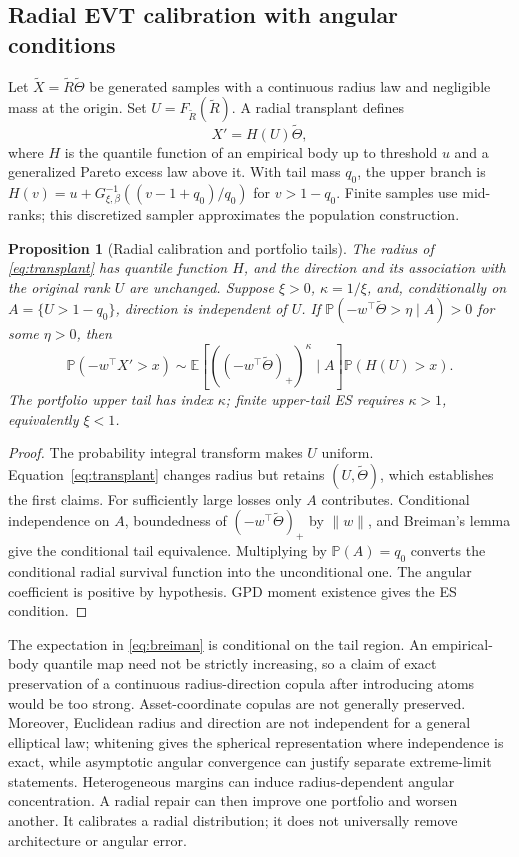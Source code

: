 \documentclass[11pt]{article}
\newtheorem{proposition}[theorem]{Proposition}
\theoremstyle{definition}\newtheorem{definition}[theorem]{Definition}
\theoremstyle{remark}\newtheorem{remark}[theorem]{Remark}
\newcommand{\E}{\mathbb E}\newcommand{\Prob}{\mathbb P}\newcommand{\R}{\mathbb R}
\begin{document}
\subsection{Radial EVT calibration with angular conditions}\label{sec:repair}
Let $\widetilde X=\widetilde R\widetilde\Theta$ be generated samples with a continuous radius law and negligible mass at the origin. Set $U=F_{\widetilde R}(\widetilde R)$. A radial transplant defines
\begin{equation}\label{eq:transplant}
X'=H(U)\widetilde\Theta,
\end{equation}
where $H$ is the quantile function of an empirical body up to threshold $u$ and a generalized Pareto excess law above it. With tail mass $q_0$, the upper branch is
$H(v)=u+G^{-1}_{\xi,\beta}((v-1+q_0)/q_0)$ for $v>1-q_0$.
Finite samples use mid-ranks; this discretized sampler approximates the population construction.

\begin{proposition}[Radial calibration and portfolio tails]\label{prop:transplant}
The radius of \eqref{eq:transplant} has quantile function $H$, and the direction and its association with the original rank $U$ are unchanged. Suppose $\xi>0$, $\kappa=1/\xi$, and, conditionally on $A=\{U>1-q_0\}$, direction is independent of $U$. If $\Prob(-w^\top\widetilde\Theta>\eta\mid A)>0$ for some $\eta>0$, then
\begin{equation}\label{eq:breiman}
\Prob(-w^\top X'>x)\sim
\E[((-w^\top\widetilde\Theta)_+)^\kappa\mid A]\Prob(H(U)>x).
\end{equation}
The portfolio upper tail has index $\kappa$; finite upper-tail ES requires $\kappa>1$, equivalently $\xi<1$.
\end{proposition}
\begin{proof}
The probability integral transform makes $U$ uniform. Equation~\eqref{eq:transplant} changes radius but retains $(U,\widetilde\Theta)$, which establishes the first claims. For sufficiently large losses only $A$ contributes. Conditional independence on $A$, boundedness of $(-w^\top\widetilde\Theta)_+$ by $\|w\|$, and Breiman's lemma give the conditional tail equivalence. Multiplying by $\Prob(A)=q_0$ converts the conditional radial survival function into the unconditional one. The angular coefficient is positive by hypothesis. GPD moment existence gives the ES condition.
\end{proof}
The expectation in \eqref{eq:breiman} is conditional on the tail region. An empirical-body quantile map need not be strictly increasing, so a claim of exact preservation of a continuous radius-direction copula after introducing atoms would be too strong. Asset-coordinate copulas are not generally preserved. Moreover, Euclidean radius and direction are not independent for a general elliptical law; whitening gives the spherical representation where independence is exact, while asymptotic angular convergence can justify separate extreme-limit statements. Heterogeneous margins can induce radius-dependent angular concentration. A radial repair can then improve one portfolio and worsen another. It calibrates a radial distribution; it does not universally remove architecture or angular error.
\end{document}
